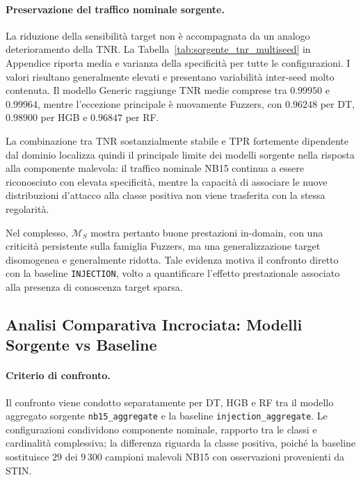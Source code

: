 \paragraph{Preservazione del traffico nominale sorgente.}
La riduzione della sensibilità target non è accompagnata da un analogo deterioramento della TNR. 
La Tabella~\ref{tab:sorgente_tnr_multiseed} in Appendice riporta media e varianza della specificità per tutte le configurazioni. 
I valori risultano generalmente elevati e presentano variabilità inter-seed molto contenuta. 
Il modello Generic raggiunge TNR medie comprese tra $0.99950$ e $0.99964$, mentre l'eccezione principale è nuovamente Fuzzers, con $0.96248$ per DT, $0.98900$ per HGB e $0.96847$ per RF.

La combinazione tra TNR sostanzialmente stabile e TPR fortemente dipendente dal dominio localizza quindi il principale limite dei modelli sorgente nella risposta alla componente malevola: il traffico nominale NB15 continua a essere riconosciuto con elevata specificità, mentre la capacità di associare le nuove distribuzioni d'attacco alla classe positiva non viene trasferita con la stessa regolarità.

Nel complesso, $\mathcal{M}_{S}$ mostra pertanto buone prestazioni in-domain, con una criticità persistente sulla famiglia Fuzzers, ma una generalizzazione target disomogenea e generalmente ridotta. 
Tale evidenza motiva il confronto diretto con la baseline \texttt{INJECTION}, volto a quantificare l'effetto prestazionale associato alla presenza di conoscenza target sparsa.



\subsection{Analisi Comparativa Incrociata: Modelli Sorgente vs Baseline}
\label{subsec:analisi_incrociata_sorgente_baseline}

\paragraph{Criterio di confronto.}
Il confronto viene condotto separatamente per DT, HGB e RF tra il modello aggregato sorgente \texttt{nb15\_aggregate} e la baseline \texttt{injection\_aggregate}. 
Le configurazioni condividono componente nominale, rapporto tra le classi e cardinalità complessiva; la differenza riguarda la classe positiva, poiché la baseline sostituisce $29$ dei $9\,300$ campioni malevoli NB15 con osservazioni provenienti da STIN.

